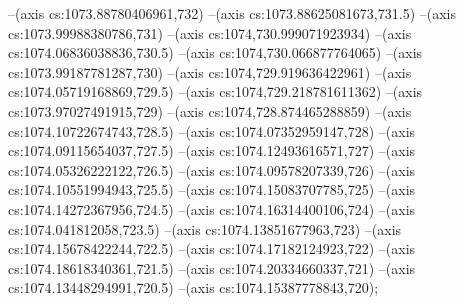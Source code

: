 --(axis cs:1073.88780406961,732)
--(axis cs:1073.88625081673,731.5)
--(axis cs:1073.99988380786,731)
--(axis cs:1074,730.999071923934)
--(axis cs:1074.06836038836,730.5)
--(axis cs:1074,730.066877764065)
--(axis cs:1073.99187781287,730)
--(axis cs:1074,729.919636422961)
--(axis cs:1074.05719168869,729.5)
--(axis cs:1074,729.218781611362)
--(axis cs:1073.97027491915,729)
--(axis cs:1074,728.874465288859)
--(axis cs:1074.10722674743,728.5)
--(axis cs:1074.07352959147,728)
--(axis cs:1074.09115654037,727.5)
--(axis cs:1074.12493616571,727)
--(axis cs:1074.05326222122,726.5)
--(axis cs:1074.09578207339,726)
--(axis cs:1074.10551994943,725.5)
--(axis cs:1074.15083707785,725)
--(axis cs:1074.14272367956,724.5)
--(axis cs:1074.16314400106,724)
--(axis cs:1074.041812058,723.5)
--(axis cs:1074.13851677963,723)
--(axis cs:1074.15678422244,722.5)
--(axis cs:1074.17182124923,722)
--(axis cs:1074.18618340361,721.5)
--(axis cs:1074.20334660337,721)
--(axis cs:1074.13448294991,720.5)
--(axis cs:1074.15387778843,720);
